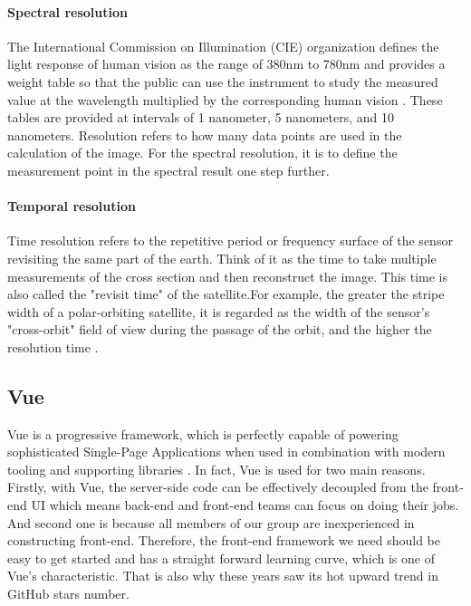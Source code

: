 \documentclass[conference]{IEEEtran}
\begin{document}
\paragraph{Spectral resolution} 
    
The International Commission on Illumination (CIE) organization defines the light response of human vision as the range of 380nm to 
780nm and provides a weight table so that the public can use the instrument to study the measured value at the wavelength multiplied 
by the corresponding human vision \cite{spectral41:online}. These tables are provided at intervals of 1 nanometer, 5 nanometers, 
and 10 nanometers. Resolution refers to how many data points are used in the calculation of the image. For the spectral resolution, 
it is to define the measurement point in the spectral result one step further.

\paragraph{Temporal resolution} 
    
Time resolution refers to the repetitive period or frequency surface of the sensor revisiting the same part of the earth. Think of it as the time to take multiple measurements of the cross section and then reconstruct the image. This time is also called the "revisit time" of the satellite.For example, the greater the stripe width of a polar-orbiting satellite, it is regarded as the width of the sensor's "cross-orbit" field of view during the passage of the orbit, and 
the higher the resolution time \cite{Topic43:online}.


\subsection{Vue}

Vue is a progressive framework, which is perfectly capable of powering sophisticated Single-Page Applications when used 
in combination with modern tooling and supporting libraries \cite{Introduc89:online}. In fact, Vue is used for two main reasons. Firstly, 
with Vue, the server-side code can be effectively decoupled from the front-end UI which means back-end and front-end 
teams can focus on doing their jobs. And second one is because all members of our group are inexperienced in constructing 
front-end. Therefore, the front-end framework we need should be easy to get started and has a straight forward learning 
curve, which is one of Vue’s characteristic. That is also why these years saw its hot upward trend in GitHub stars number.
\end{document}
